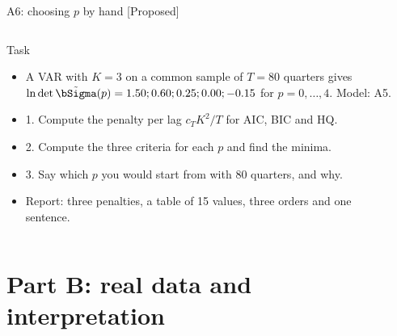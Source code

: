 \begin{frame}{A6: choosing $p$ by hand [Proposed]}
\propsub
\itemsize{\scriptsize}
\begin{columns}[T]
\begin{column}{\taskw}
\begin{block}{Task}
\begin{itemize}
    \item A VAR with $K = 3$ on a common sample of $T = 80$ quarters gives $\ln\det\tilde\bSigma(p) = 1.50; 0.60; 0.25; 0.00; -0.15$ for $p = 0, \dots, 4$. Model: A5.
    \item 1. Compute the penalty per lag $c_T K^2/T$ for AIC, BIC and HQ.
    \item 2. Compute the three criteria for each $p$ and find the minima.
    \item 3. Say which $p$ you would start from with 80 quarters, and why.
    \item Report: three penalties, a table of 15 values, three orders and one sentence.
\end{itemize}
\end{block}
\end{column}
\begin{column}{\solw}
\end{column}
\end{columns}
\end{frame}


\section{Part B: real data and interpretation}

